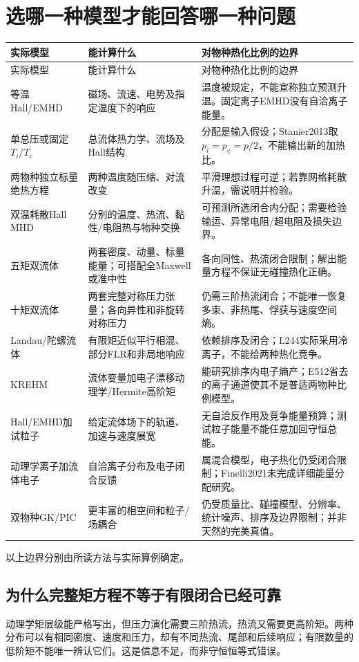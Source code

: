 \documentclass[UTF8,a4paper,11pt,openany,fontset=fandol]{ctexbook}
\begin{document}
\chapter{选哪一种模型才能回答哪一种问题}
\begingroup\small
\begin{longtable}{P{31mm}P{57mm}P{60mm}}
\toprule 实际模型 & 能计算什么 & 对物种热化比例的边界\\\midrule\endfirsthead
\toprule 实际模型 & 能计算什么 & 对物种热化比例的边界\\\midrule\endhead
等温Hall/EMHD & 磁场、流速、电势及指定温度下的响应 & 温度被规定，不能宣称独立预测升温。固定离子EMHD没有自洽离子能量。\\
单总压或固定$T_i/T_e$ & 总流体热力学、流场及Hall结构 & 分配是输入假设；Stanier2013取$p_i=p_e=p/2$，不能输出新的加热比。\\
两物种独立标量绝热方程 & 两种温度随压缩、对流改变 & 平滑理想过程可逆；若靠网格耗散升温，需说明并检验。\\
双温耗散Hall MHD & 分别的温度、热流、黏性/电阻热与物种交换 & 可预测所选闭合内分配；需要检验输运、异常电阻/超电阻及损失边界。\\
五矩双流体 & 两套密度、动量、标量能量；可搭配全Maxwell或准中性 & 各向同性、热流闭合限制；解出能量方程不保证无碰撞热化正确。\\
十矩双流体 & 两套完整对称压力张量；各向异性和非旋转对称压力 & 仍需三阶热流闭合；不能唯一恢复多束、非热尾、俘获与速度空间熵。\\
Landau/陀螺流体 & 有限矩近似平行相混、部分FLR和非局地响应 & 依赖排序及闭合；L244实际采用冷离子，不能给两种热化竞争。\\
KREHM & 流体变量加电子漂移动理学/Hermite高阶矩 & 能研究排序内电子熵产；E512省去的离子通道使其不是普适两物种比例模型。\\
Hall/EMHD加试粒子 & 给定流体场下的轨道、加速与速度展宽 & 无自洽反作用及竞争能量预算；测试粒子能量不能任意加回守恒总能。\\
动理学离子加流体电子 & 自洽离子分布及电子闭合反馈 & 属混合模型，电子热化仍受闭合限制；Finelli2021未完成详细能量分配研究。\\
双物种GK/PIC & 更丰富的相空间和粒子/场耦合 & 仍受质量比、碰撞模型、分辨率、统计噪声、排序及边界限制；并非天然的完美真值。\\
\bottomrule\end{longtable}
\endgroup
以上边界分别由所读方法与实际算例确定。\citep{Stanier2013,L223,Kaptanoglu2020,L247,TenBarge2019MMS,L244,E512,Yoon2018Heating,Finelli2021,Numata2015Heating}

\section{为什么完整矩方程不等于有限闭合已经可靠}
动理学矩层级能严格写出，但压力演化需要三阶热流，热流又需要更高阶矩。两种分布可以有相同密度、速度和压力，却有不同热流、尾部和后续响应；有限数量的低阶矩不能唯一辨认它们。这是信息不足，而非守恒恒等式错误。
\end{document}
